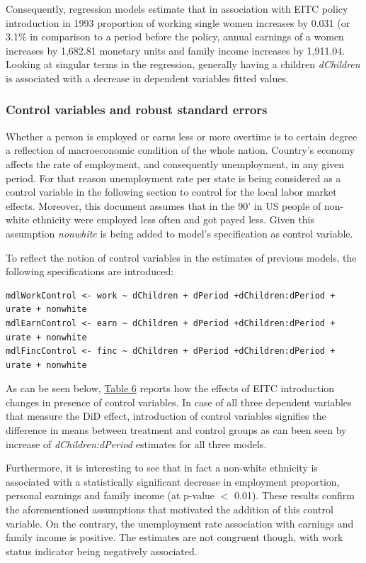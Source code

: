 \documentclass{article}
\begin{document}
Consequently, regression models estimate that in association with EITC policy introduction in 1993 proportion of working single women increases by 0.031 (or 3.1\% in comparison to a period before the policy, annual earnings of a women increases by 1,682.81 monetary units and family income increases by 1,911.04. Looking at singular terms in the regression, generally having a children \emph{dChildren} is associated with a decrease in dependent variables fitted values.  

\subsubsection{Control variables and robust standard errors}
\label{controlrobustDID}
Whether a person is employed or earns less or more overtime is to certain degree a reflection of macroeconomic condition of the whole nation. Country's economy affects the rate of employment, and consequently unemployment, in any given period. For that reason unemployment rate per state is being considered as a control variable in the following section to control for the local labor market effects. Moreover, this document assumes that in the 90' in US people of non-white ethnicity were employed less often and got payed less. Given this assumption \emph{nonwhite} is being added to model's specification as control variable. 

To reflect the notion of control variables in the estimates of previous models, the following specifications are introduced:

\begin{verbatim}
mdlWorkControl <- work ~ dChildren + dPeriod +dChildren:dPeriod + urate + nonwhite
mdlEarnControl <- earn ~ dChildren + dPeriod +dChildren:dPeriod + urate + nonwhite
mdlFincControl <- finc ~ dChildren + dPeriod +dChildren:dPeriod + urate + nonwhite

\end{verbatim}

As can be seen below, \hyperref[tab:controlvariables]{Table 6} reports how the effects of EITC introduction changes in presence of control variables. In case of all three dependent variables that measure the DiD effect, introduction of control variables signifies the difference in means between treatment and control groups as can been seen by increase of \emph{dChildren:dPeriod} estimates for all three models. 

Furthermore, it is interesting to see that in fact a non-white ethnicity is associated with a statistically significant decrease in employment proportion, personal earnings and family income (at p-value $<$ 0.01). These results confirm the aforementioned assumptions that motivated the addition of this control variable. On the contrary, the unemployment rate association with earnings and family income is positive. The estimates are not congruent though, with work status indicator being negatively associated.
\end{document}
